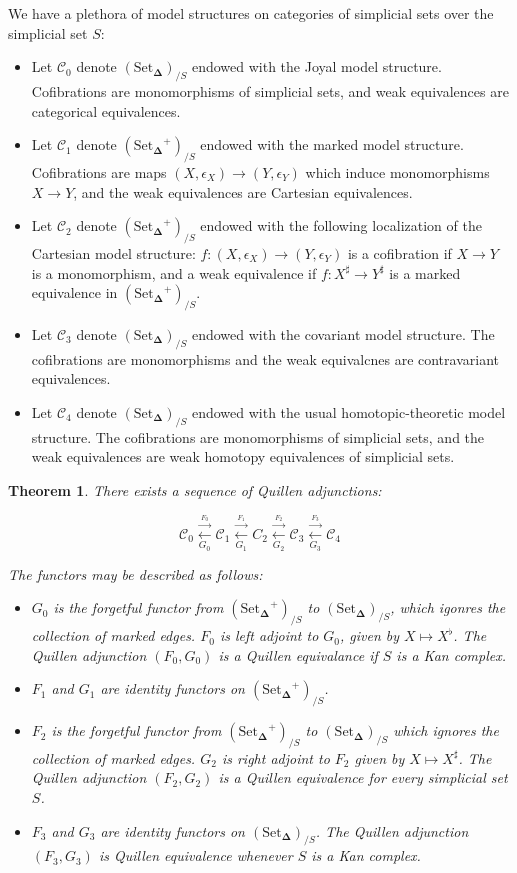 \documentclass{amsart}
\newcommand{\8}{\ensuremath{\infty}}
\newcommand{\C}{\ensuremath{\mathscr{C}}}
\newcommand{\SSet}{\ensuremath{\text{Set}_{\boldsymbol{\Delta}}}}
\newcommand{\adj}[2]{\ensuremath{\overset{\overset{#1}{\rightarrow}}{\underset{#2}{\leftarrow}}}}
\newtheorem{theorem}{Theorem}
\begin{document}
We have a plethora of model structures on categories of simplicial sets over the simplicial set $S$:

\begin{itemize}
  \item[0] Let $\C_0$ denote $(\SSet)_{/S}$ endowed with the Joyal model structure. Cofibrations are monomorphisms of simplicial sets, and weak equivalences are categorical equivalences.
  \item[1]  Let $\C_1$ denote $(\SSet^+)_{/S}$ endowed with the marked model structure. Cofibrations are maps $(X, \epsilon_X) \rightarrow (Y, \epsilon_Y)$ which induce monomorphisms $X \rightarrow Y$, and the weak equivalences are Cartesian equivalences.
  \item[2]  Let $\C_2$ denote $(\SSet^+)_{/S}$ endowed with the following localization of the Cartesian model structure: $f : (X, \epsilon_X) \rightarrow (Y, \epsilon_Y)$ is a cofibration if $X \rightarrow Y$ is a monomorphism, and a weak equivalence if $f : X^\sharp \rightarrow Y^\sharp$ is a marked equivalence in $(\SSet^+)_{/S}$.
  \item[3]  Let $\C_3$ denote $(\SSet)_{/S}$ endowed with the covariant model structure. The cofibrations are monomorphisms and the weak equivalcnes are contravariant equivalences.
  \item[4] Let $\C_4$ denote $(\SSet)_{/S}$ endowed with the usual homotopic-theoretic model structure. The cofibrations are monomorphisms of simplicial sets, and the weak equivalences are weak homotopy equivalences of simplicial sets.
\end{itemize}

\begin{theorem}
  There exists a sequence of Quillen adjunctions:

  $$
    \C_0 \adj{F_0}{G_0} \C_1 \adj{F_1}{G_1} C_2 \adj{F_2}{G_2} \C_3 \adj{F_3}{G_3} \C_4
  $$

  The functors may be described as follows:
  \begin{itemize}
    \item[A0] $G_0$ is the forgetful functor from $(\SSet^+)_{/S}$ to $(\SSet)_{/S}$, which igonres the collection of marked edges. $F_0$ is left adjoint to $G_0$, given by $X \mapsto X^\flat$. The Quillen adjunction $(F_0, G_0)$ is a Quillen equivalance if $S$ is a Kan complex.
    \item[A1] $F_1$ and $G_1$ are identity functors on $(\SSet^+)_{/S}$.
    \item[A2]  $F_2$ is the forgetful functor from $(\SSet^+)_{/S}$ to $(\SSet)_{/S}$ which ignores the collection of marked edges. $G_2$ is right adjoint to $F_2$ given by $X \mapsto X^\sharp$. The Quillen adjunction $(F_2, G_2)$ is a Quillen equivalence for every simplicial set $S$.
    \item[A3]  $F_3$ and $G_3$ are identity functors on $(\SSet)_{/S}$. The Quillen adjunction $(F_3, G_3)$ is Quillen equivalence whenever $S$ is a Kan complex.
  \end{itemize}
\end{theorem}
\end{document}
